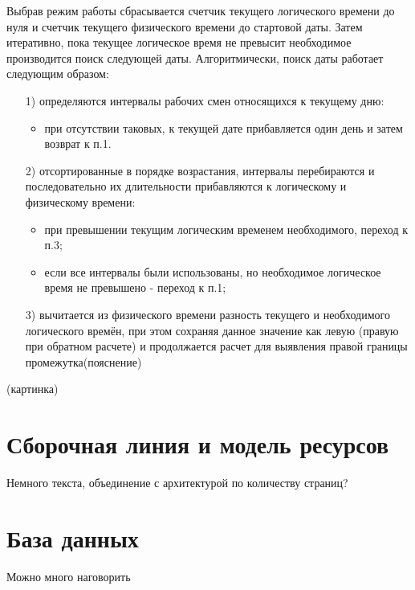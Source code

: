 Выбрав режим работы сбрасывается счетчик текущего логического времени до нуля и счетчик текущего физического времени до стартовой даты. Затем итеративно, пока текущее логическое время не превысит необходимое производится поиск следующей даты. Алгоритмически, поиск даты работает следующим образом:
\begin{enumerate}
	\item[1)] определяются интервалы рабочих смен относящихся к текущему дню:
	      \begin{itemize}
		      \item при отсутствии таковых, к текущей дате прибавляется один день и затем возврат к п.1.
	      \end{itemize}
	\item[2)] отсортированные в порядке возрастания, интервалы перебираются и последовательно их длительности прибавляются к логическому и физическому времени:
	      \begin{itemize}
		      \item при превышении текущим логическим временем необходимого, переход к п.3;
		      \item если все интервалы были использованы, но необходимое логическое время не превышено - переход к п.1;
	      \end{itemize}
	\item[3)] вычитается из физического времени разность текущего и необходимого логического времён, при этом сохраняя данное значение как левую (правую при обратном расчете) и продолжается расчет для выявления правой границы промежутка(пояснение)
\end{enumerate}
(картинка)





\section{Сборочная линия и модель ресурсов}
Немного текста, объединение с архитектурой по количеству страниц?
\section{База данных}
Можно много наговорить
